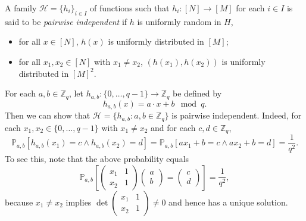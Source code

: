 \documentclass[letterpaper, reqno,11pt]{article}
\newcommand{\ZZ}{\mathbb{Z}}
\newcommand{\PP}{\mathbb{P}}
\begin{document}
\begin{definition}
  A family $\mathcal H = \{ h_i \}_{i \in I}$ of functions such that $h_i : [N] \to [M]$ for each $i \in I$ is said to be \emph{pairwise independent} if $h$ is uniformly random in $H$,
  \begin{itemize}[itemsep=0pt]
    \item for all $x \in [N]$, $h(x)$ is uniformly distributed in $[M]$;
    \item for all $x_1, x_2 \in [N]$ with $x_1 \neq x_2$, $(h(x_1), h(x_2))$ is uniformly distributed in $[M]^2$.
  \end{itemize}
\end{definition}

For each $a, b \in \ZZ_q$, let $h_{a, b} : \{ 0, \ldots, q - 1 \} \to \ZZ_q$ be defined by
$$ h_{a, b}(x) = a \cdot x + b \mod{q}. $$
Then we can show that $\mathcal H = \{ h_{a, b} : a, b \in \ZZ_q \}$ is pairwise independent. Indeed, for each $x_1, x_2 \in \{ 0, \ldots, q - 1 \}$ with $x_1 \neq x_2$ and for each $c, d \in \ZZ_q$,
$$ \PP_{a, b}\left[h_{a, b}\left(x_1\right) = c \wedge h_{a, b}\left(x_2\right) = d\right] = \PP_{a, b}\left[ax_1 + b = c \wedge ax_2 + b = d\right] = \frac{1}{q^2}. $$
To see this, note that the above probability equals
$$ \PP_{a, b}\left[\begin{pmatrix}
  x_1 & 1 \\
  x_2 & 1
\end{pmatrix} \begin{pmatrix}
  a \\
  b
\end{pmatrix} = \begin{pmatrix}
  c \\
  d
\end{pmatrix}\right] = \frac{1}{q^2}, $$
because $x_1 \neq x_2$ implies $\det \begin{pmatrix}
  x_1 & 1 \\
  x_2 & 1
\end{pmatrix} \neq 0$ and hence has a unique solution.
\end{document}
